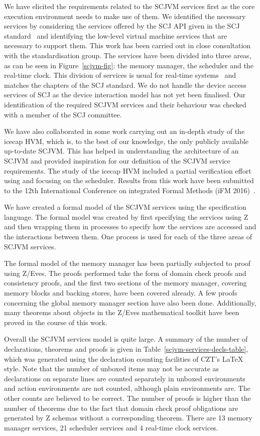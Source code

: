 \documentclass[a4paper,10pt]{report}
\begin{document}
We have elicited the requirements related to the SCJVM services first
as the core execution environment needs to make use of them.
We identified the necessary services by considering the services
offered by the SCJ API given in the SCJ standard~\cite{locke2013} and
identifying the low-level virtual machine services that are necessary
to support them.
This work has been carried out in close consultation with the
standardisation group.
The services have been divided into three areas, as can be seen in
Figure~\ref{scjvm-fig}: the memory manager, the scheduler and the
real-time clock.
This division of services is usual for real-time systems~\cite{li2003}
and matches the chapters of the SCJ standard.
We do not handle the device access services of SCJ as the device
interaction model has not yet been finalised.
Our identification of the required SCJVM services and their behaviour
was checked with a member of the SCJ committee.

We have also collaborated in some work carrying out an in-depth study
of the icecap HVM, which is, to the best of our knowledge, the only
publicly available up-to-date SCJVM.
This has helped in understanding the architecture of an SCJVM and
provided inspiration for our definition of the SCJVM service
requirements.
The study of the icecap HVM included a partial verification effort
using \Circus{} and focusing on the scheduler.
Results from this work have been submitted to the 12th International
Conference on integrated Formal Methods (iFM
2016)~\cite{freitas2016submitted}.

We have created a formal model of the SCJVM services using the
\Circus{} specification language.
The formal model was created by first specifying the services using Z
and then wrapping them in \Circus{} processes to specify how the
services are accessed and the interactions between them.
One \Circus{} process is used for each of the three areas of SCJVM
services.

The formal model of the memory manager has been partially subjected to
proof using Z/Eves.
The proofs performed take the form of domain check proofs and
consistency proofs, and the first two sections of the memory manager,
covering memory blocks and backing stores, have been covered already.
A few proofs concerning the global memory manager section have also
been done.
Additionally, many theorems about objects in the Z/Eves mathematical
toolkit have been proved in the course of this work.

Overall the SCJVM services model is quite large.
A summary of the number of declarations, theorems and proofs is given
in Table~\ref{scjvm-services-decls-table}, which was generated using
the declaration counting facilities of CZT's \LaTeX{} style.
Note that the number of unboxed items may not be accurate as
declarations on separate lines are counted separately in unboxed
environments and \Circus{} action environments are not counted,
although plain \Circus{} environments are.
The other counts are believed to be correct.
The number of proofs is higher than the number of theorems due to the
fact that domain check proof obligations are generated by Z schemas
without a corresponding theorem.
There are 13 memory manager services, 21 scheduler services and 4
real-time clock services.
\end{document}
